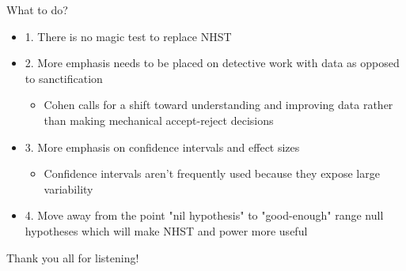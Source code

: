 \documentclass[aspectratio=169, 12pt]{beamer}
\begin{document}
\begin{frame}{What to do?}
  \begin{itemize}
  \item 1. There is no magic test to replace NHST
  \item 2. More emphasis needs to be placed on detective work with data as opposed to sanctification
  \begin{itemize}
  \item Cohen calls for a shift toward understanding and improving data rather than making mechanical accept-reject decisions
  \end{itemize}
  \item 3. More emphasis on confidence intervals and effect sizes %
  \begin{itemize}
  \item Confidence intervals aren't frequently used because they expose large variability
  \end{itemize}
  \item 4. Move away from the point "nil hypothesis" to "good-enough" range null hypotheses which will make NHST and power more useful %
  \end{itemize}
\end{frame}

\begin{frame}{}
  \begin{itemize}
    \centering
    {\Huge Thank you all for listening!}
  \end{itemize}
\end{frame}
\end{document}
